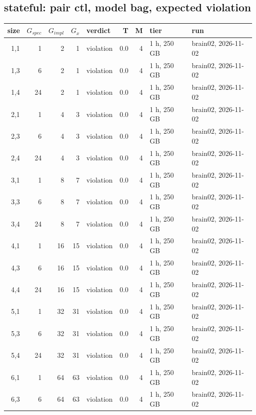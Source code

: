 \documentclass[10pt]{article}
\begin{document}
\subsection*{stateful: pair \textsf{ctl}, model bag, expected violation}
\begin{longtable}{@{}rrrrlrrll@{}}
\toprule
size & $G_{\mathit{spec}}$ & $G_{\mathit{impl}}$ & $G_x$ & verdict & T & M & tier & run \\
\midrule
\endhead
\color{blue} 1,1 & 1 & 2 & 1 & violation & 0.0 & 4 & 1 h, 250 GB & brain02, 2026-11-02 \\
\color{blue} 1,3 & 6 & 2 & 1 & violation & 0.0 & 4 & 1 h, 250 GB & brain02, 2026-11-02 \\
\color{blue} 1,4 & 24 & 2 & 1 & violation & 0.0 & 4 & 1 h, 250 GB & brain02, 2026-11-02 \\
\color{blue} 2,1 & 1 & 4 & 3 & violation & 0.0 & 4 & 1 h, 250 GB & brain02, 2026-11-02 \\
\color{blue} 2,3 & 6 & 4 & 3 & violation & 0.0 & 4 & 1 h, 250 GB & brain02, 2026-11-02 \\
\color{blue} 2,4 & 24 & 4 & 3 & violation & 0.0 & 4 & 1 h, 250 GB & brain02, 2026-11-02 \\
\color{blue} 3,1 & 1 & 8 & 7 & violation & 0.0 & 4 & 1 h, 250 GB & brain02, 2026-11-02 \\
\color{blue} 3,3 & 6 & 8 & 7 & violation & 0.0 & 4 & 1 h, 250 GB & brain02, 2026-11-02 \\
\color{blue} 3,4 & 24 & 8 & 7 & violation & 0.0 & 4 & 1 h, 250 GB & brain02, 2026-11-02 \\
\color{blue} 4,1 & 1 & 16 & 15 & violation & 0.0 & 4 & 1 h, 250 GB & brain02, 2026-11-02 \\
\color{blue} 4,3 & 6 & 16 & 15 & violation & 0.0 & 4 & 1 h, 250 GB & brain02, 2026-11-02 \\
\color{blue} 4,4 & 24 & 16 & 15 & violation & 0.0 & 4 & 1 h, 250 GB & brain02, 2026-11-02 \\
\color{blue} 5,1 & 1 & 32 & 31 & violation & 0.0 & 4 & 1 h, 250 GB & brain02, 2026-11-02 \\
\color{blue} 5,3 & 6 & 32 & 31 & violation & 0.0 & 4 & 1 h, 250 GB & brain02, 2026-11-02 \\
\color{blue} 5,4 & 24 & 32 & 31 & violation & 0.0 & 4 & 1 h, 250 GB & brain02, 2026-11-02 \\
\color{blue} 6,1 & 1 & 64 & 63 & violation & 0.0 & 4 & 1 h, 250 GB & brain02, 2026-11-02 \\
\color{blue} 6,3 & 6 & 64 & 63 & violation & 0.0 & 4 & 1 h, 250 GB & brain02, 2026-11-02 \\

\end{longtable}
\end{document}
